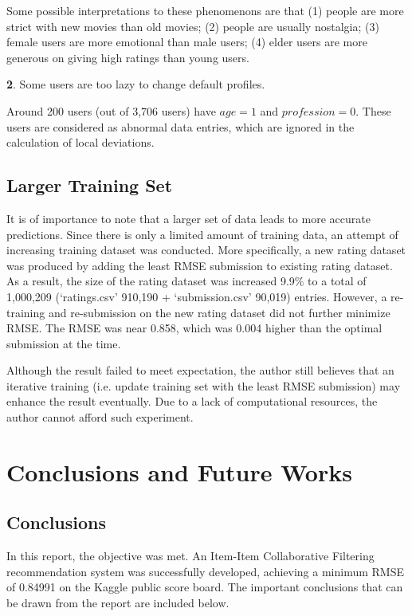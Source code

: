 \documentclass{ece}
\begin{document}
Some possible interpretations to these phenomenons are that (1) people are more strict with new movies than old movies;
(2) people are usually nostalgia; (3) female users are more emotional than male users; (4) elder users are more generous on giving high ratings than young users.

\textbf{2}. Some users are too lazy to change default profiles.

Around 200 users (out of 3,706 users) have $age=1$ and $profession=0$.
These users are considered as abnormal data entries, which are ignored in the calculation of local deviations.

\subsection{Larger Training Set}

It is of importance to note that a larger set of data leads to more accurate predictions.
Since there is only a limited amount of training data, an attempt of increasing training dataset was conducted.
More specifically, a new rating dataset was produced by adding the least RMSE submission to existing rating dataset.
As a result, the size of the rating dataset was increased 9.9\% to a total of 1,000,209 (`ratings.csv' 910,190 + `submission.csv' 90,019) entries.
However, a re-training and re-submission on the new rating dataset did not further minimize RMSE. The RMSE was near 0.858, which was 0.004 higher than the optimal submission at the time.

Although the result failed to meet expectation, the author still believes that an iterative training (i.e. update training set with the least RMSE submission) may enhance the result eventually.
Due to a lack of computational resources, the author cannot afford such experiment.

\newpage
\section{Conclusions and Future Works}

\subsection{Conclusions}

In this report, the objective was met.
An Item-Item Collaborative Filtering recommendation system was successfully developed, achieving a minimum RMSE of 0.84991 on the Kaggle public score board.
The important conclusions that can be drawn from the report are included below.
\end{document}
